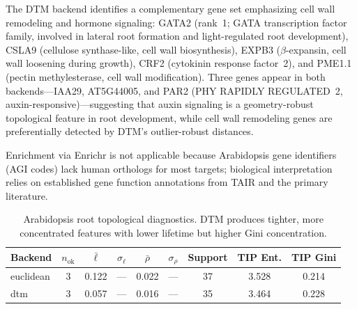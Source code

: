 \documentclass[11pt]{article}
\begin{document}
The DTM backend identifies a complementary gene set emphasizing cell wall remodeling and hormone signaling: GATA2 (rank~1; GATA transcription factor family, involved in lateral root formation and light-regulated root development), CSLA9 (cellulose synthase-like, cell wall biosynthesis), EXPB3 ($\beta$-expansin, cell wall loosening during growth), CRF2 (cytokinin response factor~2), and PME1.1 (pectin methylesterase, cell wall modification).
Three genes appear in both backends---IAA29, AT5G44005, and PAR2 (PHY RAPIDLY REGULATED~2, auxin-responsive)---suggesting that auxin signaling is a geometry-robust topological feature in root development, while cell wall remodeling genes are preferentially detected by DTM's outlier-robust distances.

Enrichment via Enrichr is not applicable because Arabidopsis gene identifiers (AGI codes) lack human orthologs for most targets; biological interpretation relies on established gene function annotations from TAIR and the primary literature.

\begin{table}[h]
\centering\small
\begin{tabular}{lcccccccc}
\toprule
Backend & $n_{\text{ok}}$ & $\bar{\ell}$ & $\sigma_\ell$ & $\bar{\rho}$ & $\sigma_\rho$ & Support & TIP Ent. & TIP Gini \\
\midrule
euclidean & 3 & 0.122 & --- & 0.022 & --- & 37 & 3.528 & 0.214 \\
dtm & 3 & 0.057 & --- & 0.016 & --- & 35 & 3.464 & 0.228 \\
\bottomrule
\end{tabular}
\caption{Arabidopsis root topological diagnostics. DTM produces tighter, more concentrated features with lower lifetime but higher Gini concentration.}
\label{tab:diag_arab}
\end{table}
\end{document}
